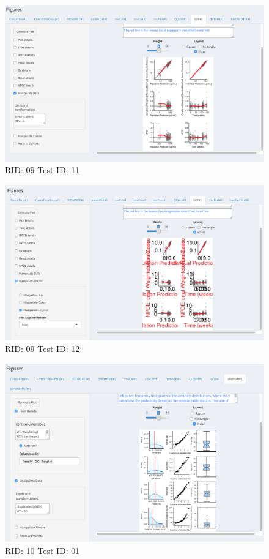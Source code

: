 \begin{figure}[H]
\includegraphics[width=.8\textwidth]{screencaps/09-11-1.png}
\caption{RID: 09 Test ID: 11}
\end{figure}
\begin{figure}[H]
\includegraphics[width=.8\textwidth]{screencaps/09-12-1.png}
\caption{RID: 09 Test ID: 12}
\end{figure}
\begin{figure}[H]
\includegraphics[width=.8\textwidth]{screencaps/10-01-1.png}
\caption{RID: 10 Test ID: 01}
\end{figure}
